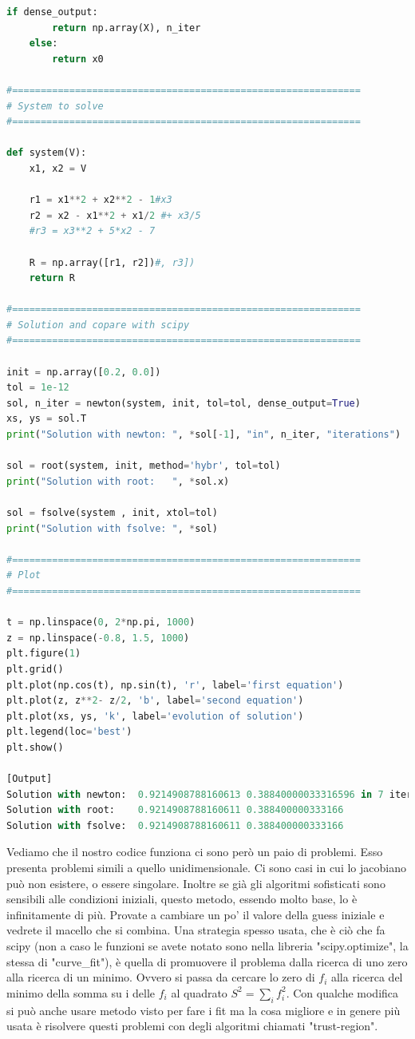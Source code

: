 \documentclass[10pt,a4paper]{article}
\begin{document}
\begin{lstlisting}[language=Python]
    if dense_output:
        return np.array(X), n_iter       
    else:
        return x0

#=============================================================
# System to solve
#=============================================================        

def system(V):
    x1, x2 = V
    
    r1 = x1**2 + x2**2 - 1#x3
    r2 = x2 - x1**2 + x1/2 #+ x3/5
    #r3 = x3**2 + 5*x2 - 7
    
    R = np.array([r1, r2])#, r3])
    return R

#=============================================================
# Solution and copare with scipy
#=============================================================    

init = np.array([0.2, 0.0])
tol = 1e-12
sol, n_iter = newton(system, init, tol=tol, dense_output=True)
xs, ys = sol.T
print("Solution with newton: ", *sol[-1], "in", n_iter, "iterations")

sol = root(system, init, method='hybr', tol=tol)
print("Solution with root:   ", *sol.x)

sol = fsolve(system , init, xtol=tol)
print("Solution with fsolve: ", *sol)

#=============================================================
# Plot
#=============================================================    

t = np.linspace(0, 2*np.pi, 1000)
z = np.linspace(-0.8, 1.5, 1000)
plt.figure(1)
plt.grid()
plt.plot(np.cos(t), np.sin(t), 'r', label='first equation')
plt.plot(z, z**2- z/2, 'b', label='second equation')
plt.plot(xs, ys, 'k', label='evolution of solution')
plt.legend(loc='best')
plt.show()

[Output]
Solution with newton:  0.9214908788160613 0.38840000033316596 in 7 iterations
Solution with root:    0.9214908788160611 0.388400000333166
Solution with fsolve:  0.9214908788160611 0.388400000333166

\end{lstlisting}
Vediamo che il nostro codice funziona ci sono però un paio di problemi. Esso presenta problemi simili a quello unidimensionale. Ci sono casi in cui lo jacobiano può non esistere, o essere singolare. Inoltre se già gli algoritmi sofisticati sono sensibili alle condizioni iniziali, questo metodo, essendo molto base, lo è infinitamente di più. Provate a cambiare un po' il valore della guess iniziale e vedrete il macello che si combina. Una strategia spesso usata, che è ciò che fa scipy (non a caso le funzioni se avete notato sono nella libreria "scipy.optimize", la stessa di "curve\_fit"), è quella di promuovere il problema dalla ricerca di uno zero alla ricerca di un minimo. Ovvero si passa da cercare lo zero di $f_i$ alla ricerca del minimo della somma su i delle $f_i$ al quadrato $S^2 = \sum_i f_i^2$. Con qualche modifica si può anche usare metodo visto per fare i fit ma la cosa migliore e in genere più usata è risolvere questi problemi con degli algoritmi chiamati "trust-region".
\end{document}
